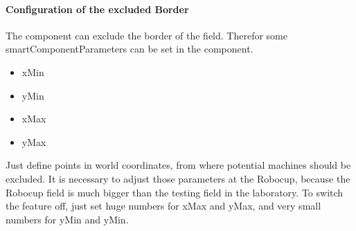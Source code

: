\paragraph{Configuration of the excluded Border}
The component can exclude the border of the field. Therefor some smartComponentParameters can be set in the component.
 
\begin{itemize}
\item xMin
\item yMin
\item xMax
\item yMax
\end{itemize}

Just define points in world coordinates, from where potential machines should be excluded.
It is necessary to adjust those parameters at the Robocup, because the Robocup field is much bigger than the testing field in the laboratory.
To switch the feature off, just set huge numbers for xMax and yMax, and very small numbers for yMin and yMin.







